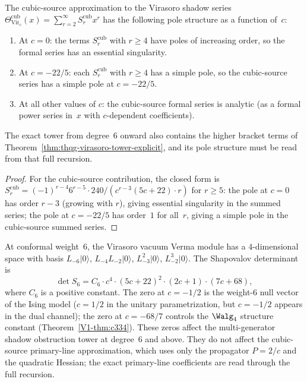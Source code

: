 \begin{proposition}
The cubic-source approximation to the Virasoro shadow series
$\Theta_{\mathrm{Vir}_c}^{\mathrm{cub}}(x)
= \sum_{r=2}^\infty S_r^{\mathrm{cub}} x^r$
has the following pole structure as a function of~$c$:
\begin{enumerate}[label=\textup{(\roman*)}]
\item At $c = 0$: the terms $S_r^{\mathrm{cub}}$ with $r \geq 4$ have
 poles of increasing order, so the formal series has
 an essential singularity.
\item At $c = -22/5$: each $S_r^{\mathrm{cub}}$ with $r \geq 4$ has a
 simple pole, so the cubic-source series has a simple pole
 at $c = -22/5$.
\item At all other values of $c$: the cubic-source formal series
 is analytic (as a formal power series in~$x$ with
 $c$-dependent coefficients).
\end{enumerate}
The exact tower from degree~$6$ onward also contains the higher bracket
terms of Theorem~\textup{\ref{thm:thqg-virasoro-tower-explicit}}, and
its pole structure must be read from that full recursion.
\end{proposition}

\begin{proof}
For the cubic-source contribution, the closed form is
$S_r^{\mathrm{cub}} = (-1)^{r-4} 6^{r-5} \cdot 240 /
(c^{r-3}(5c+22) \cdot r)$
for $r \geq 5$: the pole at $c = 0$ has order $r - 3$
(growing with $r$), giving essential singularity in the
summed series; the pole at $c = -22/5$ has order~$1$
for all~$r$, giving a simple pole in the cubic-source summed series.
\end{proof}

\begin{remark}
At conformal weight~$6$, the Virasoro vacuum Verma module
has a $4$-dimensional space with basis
$L_{-6}|0\rangle$, $L_{-4}L_{-2}|0\rangle$,
$L_{-3}^2|0\rangle$, $L_{-2}^3|0\rangle$.
The Shapovalov determinant is
\[
\det S_6 = C_6 \cdot c^4 \cdot (5c+22)^2 \cdot (2c+1)
\cdot (7c+68),
\]
where $C_6$ is a positive constant. The zero at
$c = -1/2$ is the weight-$6$ null vector of the Ising
model ($c = 1/2$ in the unitary parametrization, but
$c = -1/2$ appears in the dual channel); the zero at
$c = -68/7$ controls the $\Walg_4$ structure constant
(Theorem~\ref{V1-thm:c334}). These zeros affect the
multi-generator shadow obstruction tower at degree~$6$ and above.
They do not affect the cubic-source primary-line approximation, which
uses only the propagator $P = 2/c$ and the quadratic Hessian; the exact
primary-line coefficients are read through the full recursion.
\end{remark}

